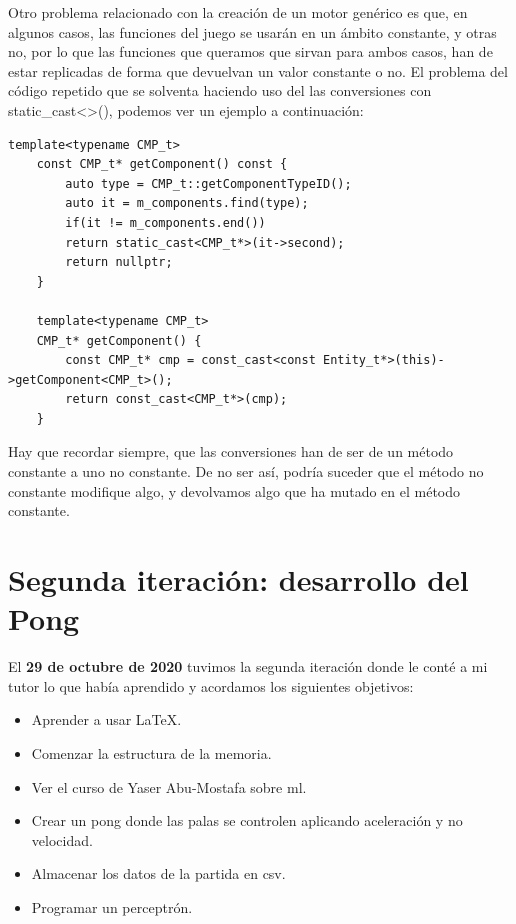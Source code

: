 Otro problema relacionado con la creación de un motor genérico es que, en algunos casos, las funciones del juego se usarán en un ámbito constante, y otras no, por lo que las funciones que queramos que sirvan para ambos casos, han de estar replicadas de forma que devuelvan un valor constante o no. El problema del código repetido que se solventa haciendo uso del las conversiones con static\_cast<>(), podemos ver un ejemplo a continuación:
\begin{lstlisting}[style=C-color, caption={Ejemplo de conversion de un método constante a no constante},label=C_code-color]
	template<typename CMP_t>
	const CMP_t* getComponent() const {
		auto type = CMP_t::getComponentTypeID();
		auto it = m_components.find(type);
		if(it != m_components.end()) 
		return static_cast<CMP_t*>(it->second);
		return nullptr;
	}
	
	template<typename CMP_t>
	CMP_t* getComponent() {
		const CMP_t* cmp = const_cast<const Entity_t*>(this)->getComponent<CMP_t>();
		return const_cast<CMP_t*>(cmp);
	}
\end{lstlisting}
Hay que recordar siempre, que las conversiones han de ser de un método constante a uno no constante. De no ser así, podría suceder que el método no constante modifique algo, y devolvamos algo que ha mutado en el método constante.

\section{Segunda iteración: desarrollo del Pong}
El \textbf{29 de octubre de 2020} tuvimos la segunda iteración donde le conté a mi tutor lo que había aprendido y acordamos los siguientes objetivos:
\begin{itemize}
  \item Aprender a usar \LaTeX.
  \item Comenzar la estructura de la memoria.
  \item Ver el curso de Yaser Abu-Mostafa sobre \gls{ml}.
  \item Crear un pong donde las palas se controlen aplicando aceleración y no velocidad.
  \item Almacenar los datos de la partida en \gls{csv}.
  \item Programar un perceptrón.
\end{itemize}

